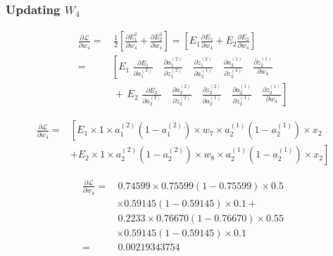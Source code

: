 \documentclass[conference]{IEEEtran}
\begin{document}
\subsubsection{Updating $W_4$}
\begin{align}
    \frac{\partial \mathcal{L}}{\partial w_4}  = & \, \frac{1}{2} \left[\frac{\partial E_1^2}{\partial w_4} + \frac{\partial E_2^2}{\partial w_4} \right]= \left[E_1\frac{\partial E_1}{\partial w_4} + E_2 \frac{\partial E_2}{\partial w_4}\right]                                                                                                                   \\
    =                                            & \left[E_1 \,\, \frac{\partial E_1}{\partial a_1^{(2)}}    \quad   \frac{\partial a_1^{(2)}}{\partial z_1^{(2)}}    \quad   \frac{\partial z_1^{(2)}}{\partial a_2^{(1)}}     \quad  \frac{\partial a_2^{(1)}}{\partial z_2^{(1)}}   \quad    \frac{\partial z_2^{(1)}}{\partial w_4}    \right. \nonumber           \\
                                                 & \left. \, + \, E_2 \,\, \frac{\partial E_2}{\partial a_2^{(2)}}   \quad    \frac{\partial a_2^{(2)}}{\partial z_2^{(2)}}  \quad     \frac{\partial z_2^{(2)}}{\partial a_2^{(1)}}    \quad   \frac{\partial a_2^{(1)}}{\partial z_2^{(1)}}     \quad  \frac{\partial z_2^{(1)}}{\partial w_4}     \right] \nonumber
\end{align}

\begin{small}
    \begin{align*}
        \frac{\partial \mathcal{L}}{\partial w_4}  = & \left[E_1 \times 1 \times a_1^{(2)} \left(1 - a_1^{(2)}\right)  \times w_7 \times a_2^{(1)} \left(1 - a_2^{(1)}\right) \times x_2 \right.   \\
                                                     & \left. + E_2 \times 1 \times a_2^{(2)} \left(1 - a_2^{(2)}\right) \times w_8 \times a_2^{(1)} \left(1 - a_2^{(1)}\right) \times x_2 \right]
    \end{align*}
\end{small}

\begin{align*}
    \frac{\partial \mathcal{L}}{\partial w_4}  = & \, 0.74599 \times 0.75599 (1 - 0.75599) \times 0.5 \\
                                                 & \times 0.59145 (1 - 0.59145) \times 0.1 +          \\
                                                 & \, 0.2233 \times 0.76670 (1 - 0.76670) \times 0.55 \\
                                                 & \times 0.59145 (1 - 0.59145) \times 0.1            \\
    =                                            & \, \mathbf{0.00219343754}
\end{align*}
\end{document}

